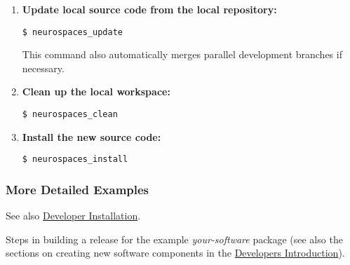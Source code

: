 \documentclass[12pt]{article}
\begin{document}
\begin{enumerate}
\item {\bf Update local source code from the local repository:}
\begin{verbatim}
$ neurospaces_update
\end{verbatim}
This command also automatically merges parallel development branches
  if necessary.

\item {\bf Clean up the local workspace:}
\begin{verbatim}
$ neurospaces_clean
\end{verbatim}

\item {\bf Install the new source code:}
\begin{verbatim}
$ neurospaces_install
\end{verbatim}

\end{enumerate}

\subsubsection*{More Detailed Examples}

See also
\href{../installation-developer/installation-developer.tex}{Developer
  Installation}.

Steps in building a release for the example {\it your-software}
package (see also the
  sections on creating new software components in the \href{../developers-intro/developers-intro.tex}{Developers
  Introduction}).
\end{document}
